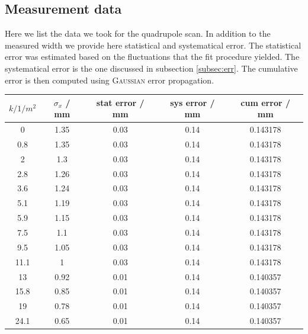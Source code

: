 \documentclass[11pt,a4paper,notitlepage]{scrartcl}
\begin{document}
\subsection{Measurement data}
Here we list the data we took for the quadrupole scan. In addition to the measured width we provide here statistical and systematical error. The statistical error was estimated based on the fluctuations that the fit procedure yielded. The systematical error is the one discussed in subsection \ref{subsec:err}. The cumulative error is then computed using \textsc{Gaussian} error propagation.
\begin{table}[htbp]
	\centering
	\begin{tabular}{c|c|c|c|c}
		$k / 1/m^2$ & $\sigma_x$ / mm & stat error / mm & sys error / mm & cum error / mm \\
		\hline
		\hline
		0         & 1.35               & 0.03            & 0.14           & 0.143178       \\
		0.8       & 1.35               & 0.03            & 0.14           & 0.143178       \\
		2         & 1.3                & 0.03            & 0.14           & 0.143178       \\
		2.8       & 1.26               & 0.03            & 0.14           & 0.143178       \\
		3.6       & 1.24               & 0.03            & 0.14           & 0.143178       \\
		5.1       & 1.19               & 0.03            & 0.14           & 0.143178       \\
		5.9       & 1.15               & 0.03            & 0.14           & 0.143178       \\
		7.5       & 1.1                & 0.03            & 0.14           & 0.143178       \\
		9.5       & 1.05               & 0.03            & 0.14           & 0.143178       \\
		11.1      & 1                  & 0.03            & 0.14           & 0.143178       \\
		13        & 0.92               & 0.01            & 0.14           & 0.140357       \\
		15.8      & 0.85               & 0.01            & 0.14           & 0.140357       \\
		19        & 0.78               & 0.01            & 0.14           & 0.140357       \\
		24.1      & 0.65               & 0.01            & 0.14           & 0.140357       \\

\end{tabular}
\end{table}
\end{document}
